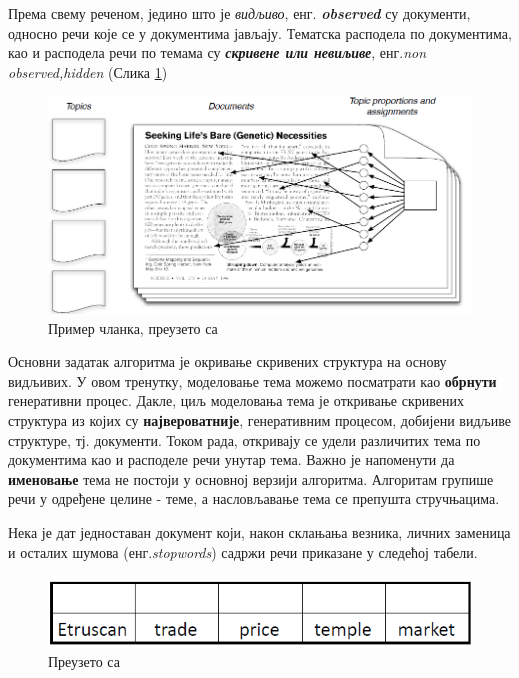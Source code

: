 Према свему реченом, једино што је \textit{видљиво}, енг. \textbf{\textit{observed}} су документи, односно речи које се у документима јављају.  Тематска расподела по документима, као и расподела речи по темама су \textbf{\textit{скривене или невиљиве}}, енг.\textit{non observed,hidden} (Слика \ref{fig:slika2})

\begin{figure}[H]
    \centering
   \includegraphics[scale=0.5]{./Slike/slika2.png} 
	\caption{Пример чланка, преузето са \cite{blei2}}
	\label{fig:slika2}
\end{figure}

Основни задатак алгоритма је окривање скривених структура на основу видљивих. У овом тренутку, моделовање тема можемо посматрати као \textbf{обрнути} генеративни процес. Дакле, циљ моделовања тема је откривање скривених структура из којих су \textbf{највероватније}, генеративним процесом, добијени видљиве структуре, тј. документи. Током рада, откривају се удели различитих тема по документима као и расподеле речи унутар тема.
Важно је напоменути да \textbf{именовање} тема не постоји у основној верзији алгоритма. Алгоритам групише речи у одређене целине - теме, а насловљавање тема се препушта стручњацима.




Нека је дат једноставан документ који, након склањања везника, личних заменица и осталих шумова (енг.\textit{stopwords}) садржи речи приказане у следећој табели.

\begin{figure}[H]
    \centering
   \includegraphics[scale=0.8]{./Slike/slika3.png} 
	\caption{Преузето са \cite{mimno1}}
	\label{fig:slika3}
\end{figure}

